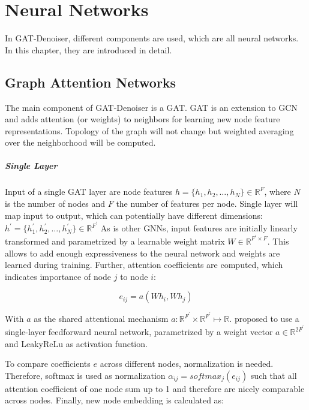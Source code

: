 \chapter{Neural Networks}
\label{sec:neural_networks}
In GAT-Denoiser, different components are used, which are all neural networks.
In this chapter, they are introduced in detail.

\section{Graph Attention Networks}
The main component of GAT-Denoiser is a GAT.
GAT is an extension to GCN and adds attention (or weights) to neighbors for learning new node feature representations. 
Topology of the graph will not change but weighted averaging over the neighborhood will be computed.

\paragraph{Single Layer}
Input of a single GAT layer are node features $h = \{ h_1, h_2, \dots , h_N \} \in \mathbb{R}^F$, 
where $N$ is the number of nodes and $F$ the number of features per node. 
Single layer will map input to output, which can potentially have different dimensions: 
$h^{\prime} = \{ h_1^{\prime}, h_2^{\prime}, \dots, h_N^{\prime} \} \in \mathbb{R}^{F^{\prime}} $
As is other GNNs, input features are initially linearly transformed and parametrized by a learnable weight matrix 
$W \in \mathbb{R}^{F^{\prime} \times F}$. 
This allows to add enough expressiveness to the neural network and weights are learned during training.
Further, attention coefficients are computed, which indicates importance of node $j$ to node $i$:

\begin{equation}
  e_{ij} = a(Wh_i, Wh_j)
\end{equation}

With $a$ as the shared attentional mechanism $a : \mathbb{R}^{F^{\prime}} \times \mathbb{R}^{F^{\prime}} \mapsto \mathbb{R}$.
\citet{GAT} proposed to use a single-layer feedforward neural network, parametrized by a weight vector $a \in \mathbb{R}^{2F^{\prime}}$
and LeakyReLu as activation function.

To compare coefficients $e$ across different nodes, normalization is needed.
Therefore, softmax is used as normalization $\alpha_{ij} = softmax_j(e_{ij})$ 
such that all attention coefficient of one node sum up to 1 and therefore are nicely comparable across nodes.
Finally, new node embedding is calculated as:

